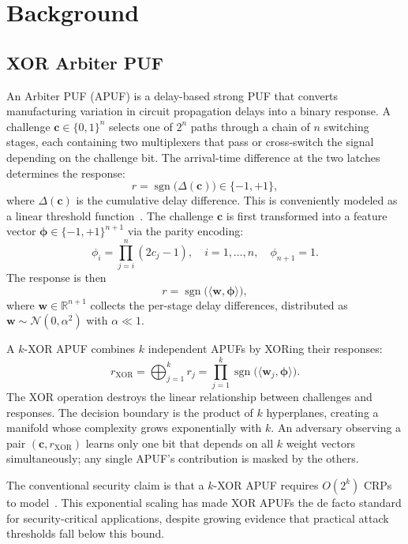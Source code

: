 \section{Background}
\label{sec:background}

\subsection{XOR Arbiter PUF}

An Arbiter PUF (APUF) is a delay-based strong PUF that converts manufacturing
variation in circuit propagation delays into a binary response.  A challenge
$\mathbf{c} \in \{0, 1\}^{n}$ selects one of $2^n$ paths through a chain of
$n$ switching stages, each containing two multiplexers that pass or
cross-switch the signal depending on the challenge bit.  The arrival-time
difference at the two latches determines the response:
\[
r = \operatorname{sgn}\big(\Delta(\mathbf{c})\big) \in \{-1, +1\},
\]
where $\Delta(\mathbf{c})$ is the cumulative delay difference.  This is
conveniently modeled as a linear threshold function~\cite{ruhrmair2010modeling}.
The challenge $\mathbf{c}$ is first transformed into a feature vector
$\boldsymbol{\phi} \in \{-1, +1\}^{n+1}$ via the parity encoding:
\[
\phi_i = \prod_{j=i}^{n} (2c_j - 1), \quad i = 1, \ldots, n,
\quad \phi_{n+1} = 1.
\]
The response is then
\[
r = \operatorname{sgn}\big(\langle \mathbf{w}, \boldsymbol{\phi} \rangle\big),
\]
where $\mathbf{w} \in \mathbb{R}^{n+1}$ collects the per-stage delay
differences, distributed as $\mathbf{w} \sim \mathcal{N}(0, \alpha^2)$ with
$\alpha \ll 1$.

A $k$-XOR APUF combines $k$ independent APUFs by XORing their responses:
\[
r_{\text{XOR}} = \bigoplus_{j=1}^{k} r_j
= \prod_{j=1}^{k} \operatorname{sgn}\big(\langle \mathbf{w}_j,
\boldsymbol{\phi} \rangle\big).
\]
The XOR operation destroys the linear relationship between challenges and
responses.  The decision boundary is the product of $k$ hyperplanes, creating
a manifold whose complexity grows exponentially with $k$.  An adversary observing a pair $(\mathbf{c}, r_{\text{XOR}})$ learns only
one bit that depends on all $k$ weight vectors simultaneously; any single
APUF's contribution is masked by the others.

The conventional security claim is that a $k$-XOR APUF requires $O(2^k)$ CRPs
to model~\cite{ruhrmair2010modeling}.  This exponential scaling has made XOR
APUFs the de facto standard for security-critical applications, despite
growing evidence that practical attack thresholds fall below this bound.

